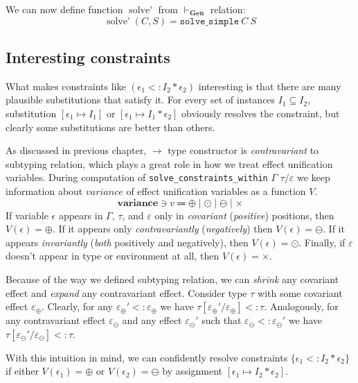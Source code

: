 \documentclass[declaration,shortabstract]{iithesis}
\theoremstyle{definition} \newtheorem{definition}{Definition}[section]
\begin{document}
We can now define function $\operatorname{solve'}$ from $ \vdash_\textbf{Gen} $ relation:
$$ \operatorname{solve'}(C, S) = \texttt{solve\_simple}\:C\:S $$ 

\subsection{Interesting constraints}
What makes constraints like $(\epsilon_1 <: I_2 * \epsilon_2)$ interesting is that there are many
plausible substitutions that satisfy it.
For every set of instances $I_1 \subseteq I_2$, substitution $[\epsilon_1 \mapsto I_1]$ or 
$[\epsilon_1 \mapsto I_1 * \epsilon_2]$ obviously resolves the constraint, but clearly some substitutions are better than others. 

As discussed in previous chapter, $\rightarrow$ type constructor is \textit{contravariant} to subtyping relation, which plays a great role in how we treat effect unification variables.
During computation of \texttt{solve\_constraints\_within} $\Gamma$ $\tau/\varepsilon$ we keep information about $variance$ of effect unification variables as a function $V$.
$$\textbf{variance} \ni v \Coloneqq \oplus \mid \odot \mid \ominus \mid \times$$
If variable $\epsilon$ appears in $\Gamma$, $\tau$, and $\varepsilon$ only in \textit{covariant} (\textit{positive}) positions, then $V(\epsilon) = \oplus$.
If it appears only \textit{contravariantly} (\textit{negatively}) then $V(\epsilon) = \ominus$. If it appears \textit{invariantly} (\textit{both} positively and negatively), then $V(\epsilon) = \odot$. Finally, if $\varepsilon$ doesn't appear in type or environment at all, then $V(\epsilon) = \times$.

Because of the way we defined subtyping relation, we can \textit{shrink} any covariant effect and \textit{expand} any contravariant effect.
Consider type $\tau$ with some covariant effect $\varepsilon_\oplus$.
Clearly, for any $\varepsilon_\oplus' <: \varepsilon_\oplus$ we have
$ \tau[\varepsilon_\oplus' / \varepsilon_\oplus] <: \tau $.
Analogously, for any contravariant effect $\varepsilon_\ominus$ and 
any effect $\varepsilon_\ominus'$ such that $\varepsilon_\ominus <: \varepsilon_\ominus'$
we have
$ \tau[\varepsilon_\ominus' / \varepsilon_\ominus] <: \tau$.

With this intuition in mind, we can confidently resolve constraints
$\{\epsilon_1 <: I_2 * \epsilon_2\}$ if either $V(\epsilon_1) = \oplus$ or $V(\epsilon_2)=\ominus$
by assignment $[\epsilon_1 \mapsto I_2 * \epsilon_2]$.
\end{document}
